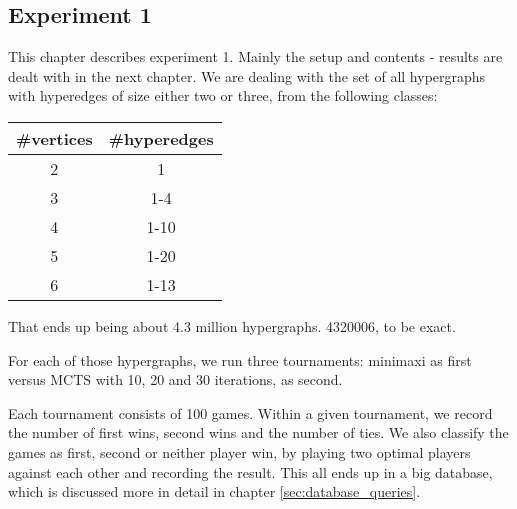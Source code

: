 \subsection{Experiment 1}
\label{sec:experiment1}

This chapter describes experiment 1. Mainly the setup and contents - results are dealt with in the next chapter.
We are dealing with the set of all hypergraphs with hyperedges of size either two or three, from the following classes:

\begin{tabular}{ c | c }
\#vertices & \#hyperedges \\ \hline
2&1 \\ \hline
3&1-4 \\ \hline
4&1-10 \\ \hline
5&1-20 \\ \hline
6&1-13 \\ \hline
\end{tabular}

That ends up being about 4.3 million hypergraphs. 4320006, to be exact.

For each of those hypergraphs, we run three tournaments: minimaxi as first versus MCTS with 10, 20 and 30 iterations, as second.

Each tournament consists of 100 games. Within a given tournament, we record the number of first wins, second wins and the number of ties.
We also classify the games as first, second or neither player win, by playing two optimal players against each other and recording the result.
This all ends up in a big database, which is discussed more in detail in chapter \ref{sec:database_queries}.
